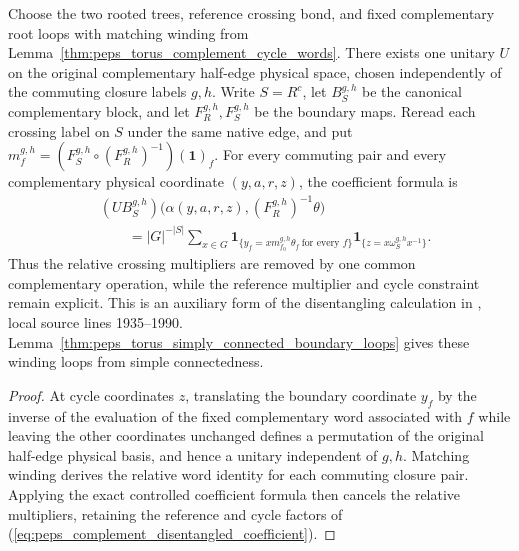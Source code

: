 \begin{lemma}%
    \label{thm:peps_torus_complement_disentangling}
    \leanok
    Choose the two rooted trees, reference crossing bond, and fixed
    complementary root loops with matching winding from
    Lemma~\ref{thm:peps_torus_complement_cycle_words}. There exists one
    unitary $U$ on the original complementary half-edge physical space,
    chosen independently of the commuting closure labels $g,h$.
    Write $S=R^c$, let $B_S^{g,h}$ be the canonical complementary
    block, and let $F_R^{g,h},F_S^{g,h}$ be the boundary maps.
    Reread each crossing label on $S$ under the same native edge, and put
    $m_f^{g,h}=(F_S^{g,h}\circ(F_R^{g,h})^{-1})(\mathbf 1)_f$.
    For every commuting pair and every complementary physical coordinate
    $(y,a,r,z)$, the coefficient formula is
    \begin{align}
         & (U B_S^{g,h})\bigl(\alpha(y,a,r,z),
        (F_R^{g,h})^{-1}\theta\bigr)           \\
         & \qquad=|G|^{-|S|}\sum_{x\in G}
        \mathbf 1_{\{y_f=xm_{f_0}^{g,h}\theta_f\ \text{for every }f\}}
        \mathbf 1_{\{z=x\omega_S^{g,h}x^{-1}\}}.
        \label{eq:peps_complement_disentangled_coefficient}
    \end{align}
    Thus the relative crossing multipliers are removed by one common
    complementary operation, while the reference multiplier and
    cycle constraint remain explicit. This is an auxiliary form of the
    disentangling calculation in
    \cite[Theorem~6.9]{Schuch2010PEPS}, local source lines 1935--1990.
    Lemma~\ref{thm:peps_torus_simply_connected_boundary_loops}
    gives these winding loops from simple connectedness.
\end{lemma}

\begin{proof}\leanok
    At cycle coordinates $z$, translating the boundary coordinate $y_f$
    by the inverse of the evaluation of the fixed complementary word
    associated with $f$ while leaving the other coordinates unchanged
    defines a permutation of the original half-edge physical basis, and hence
    a unitary independent of $g,h$. Matching winding derives the
    relative word identity for each commuting closure pair. Applying
    the exact controlled coefficient formula then cancels the relative
    multipliers, retaining the reference and cycle factors of
    (\ref{eq:peps_complement_disentangled_coefficient}).
\end{proof}

